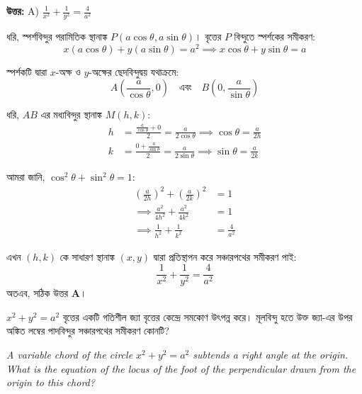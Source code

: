 \documentclass[12pt, a4paper]{article}
\begin{document}
\vspace{0.5em}
\begin{tcolorbox}[answerbox]
    \textbf{\color{success} উত্তর:} A) $\frac{1}{x^2} + \frac{1}{y^2} = \frac{4}{a^2}$
\end{tcolorbox}
\vspace{1em}

\begin{tcolorbox}[solutionbox={সমাধান (Solution)}]
    \noindent
    ধরি, স্পর্শবিন্দুর পরামিতিক স্থানাঙ্ক $P(a\cos\theta, a\sin\theta)$। বৃত্তের $P$ বিন্দুতে স্পর্শকের সমীকরণ: 
    \[ x(a\cos\theta) + y(a\sin\theta) = a^2 \implies x\cos\theta + y\sin\theta = a \]
    
    স্পর্শকটি দ্বারা $x$-অক্ষ ও $y$-অক্ষের ছেদবিন্দুদ্বয় যথাক্রমে: 
    \[ A\left(\frac{a}{\cos\theta}, 0\right) \quad \text{এবং} \quad B\left(0, \frac{a}{\sin\theta}\right) \]
    
    ধরি, $AB$ এর মধ্যবিন্দুর স্থানাঙ্ক $M(h, k)$:
    \begin{align*}
        h &= \frac{\frac{a}{\cos\theta} + 0}{2} = \frac{a}{2\cos\theta} \implies \cos\theta = \frac{a}{2h} \\
        k &= \frac{0 + \frac{a}{\sin\theta}}{2} = \frac{a}{2\sin\theta} \implies \sin\theta = \frac{a}{2k}
    \end{align*}
    
    আমরা জানি, $\cos^2\theta + \sin^2\theta = 1$:
    \begin{align*}
        \left(\frac{a}{2h}\right)^2 + \left(\frac{a}{2k}\right)^2 &= 1 \\
        \implies \frac{a^2}{4h^2} + \frac{a^2}{4k^2} &= 1 \\
        \implies \frac{1}{h^2} + \frac{1}{k^2} &= \frac{4}{a^2}
    \end{align*}
    
    এখন $(h, k)$ কে সাধারণ স্থানাঙ্ক $(x, y)$ দ্বারা প্রতিস্থাপন করে সঞ্চারপথের সমীকরণ পাই:
    \[ \frac{1}{x^2} + \frac{1}{y^2} = \frac{4}{a^2} \]
    অতএব, সঠিক উত্তর \textbf{A}।
\end{tcolorbox}

\begin{tcolorbox}[questionbox={প্রশ্ন (Question) 36}]
    \noindent
    $x^2 + y^2 = a^2$ বৃত্তের একটি গতিশীল জ্যা বৃত্তের কেন্দ্রে সমকোণ উৎপন্ন করে। মূলবিন্দু হতে উক্ত জ্যা-এর উপর অঙ্কিত লম্বের পাদবিন্দুর সঞ্চারপথের সমীকরণ কোনটি?
    
    \vspace{0.8em}
    \begin{english}
    \noindent\textit{\color{darkgray}
    A variable chord of the circle $x^2 + y^2 = a^2$ subtends a right angle at the origin. What is the equation of the locus of the foot of the perpendicular drawn from the origin to this chord?
    }
    \end{english}
\end{tcolorbox}
\end{document}
